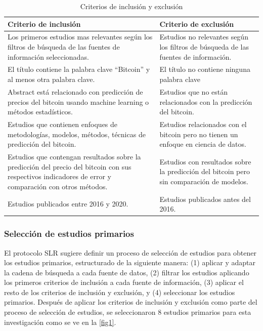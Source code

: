\begin{table}[h!]
	\centering
	\begin{tabular}{ | m{7cm}| m{7cm} | }
		\hline
		\textbf{Criterio de inclusión} & \textbf{Criterio de exclusión}\\
		\hline
		
		Los primeros estudios mas relevantes según los filtros de búsqueda de las fuentes de información seleccionadas.& Estudios no relevantes según los filtros de búsqueda de las fuentes de información.\\
		
		\hline
		El título contiene la palabra clave ``Bitcoin'' y al menos otra palabra clave. &  El título no contiene ninguna palabra clave\\ 
		\hline
		Abstract está relacionado con predicción de precios del bitcoin usando machine learning o métodos estadísticos. & Estudios que no están relacionados con la predicción del
		bitcoin.\\
		\hline
		Estudios que contienen enfoques de metodologías, modelos, métodos, técnicas de predicción del bitcoin. & Estudios relacionados con el bitcoin pero no tienen un
		enfoque en ciencia de datos.\\
		\hline
		Estudios que contengan resultados sobre la predicción del precio del bitcoin con sus respectivos indicadores de error y comparación con otros métodos. & Estudios con resultados sobre la predicción del bitcoin pero sin comparación de modelos.\\
		\hline
		Estudios publicados entre 2016 y 2020. & Estudios publicados antes del 2016.\\
		\hline
	\end{tabular}
	\caption{Criterios de inclusión y exclusión}
	\label{tab:Table1}
\end{table}

\subsubsection{Selección de estudios primarios}
El protocolo SLR \parencite{kitchenhamSystematicLiteratureReviews2009} sugiere definir un proceso de selección de estudios para obtener los estudios primarios, estructurado de la siguiente manera: (1) aplicar y adaptar la cadena de búsqueda a cada fuente de datos, (2) filtrar los estudios aplicando los primeros criterios de inclusión a cada fuente de información, (3) aplicar el resto de los criterios de inclusión y exclusión, y (4) seleccionar los estudios primarios. Después de aplicar los criterios de inclusión y exclusión como parte del proceso de selección de estudios, se seleccionaron 8 estudios primarios para esta investigación como se ve en la \autoref{fig1}.\\

